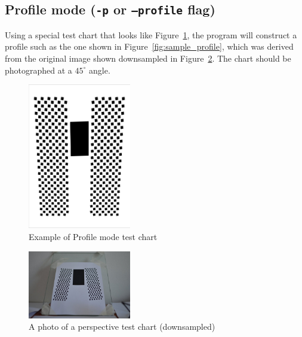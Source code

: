 \documentclass[a4paper]{article}
\begin{document}
\subsection{Profile mode (\texttt{-p} or \texttt{--profile} flag)}
\label{sec:profile_mode}
Using a special test chart that looks like
Figure~\ref{fig:profile_test_chart}, the program will construct a profile
such as the one shown in Figure~\ref{fig:sample_profile}, which was derived
from the original image shown downsampled in
Figure~\ref{fig:profile_test_chart_photo}. The chart should
be photographed at a $45^\circ$ angle.

\begin{figure}
\centering
\includegraphics[width=0.4\textwidth]{figures/mtf_profile_test_chart}
\caption{Example of Profile mode test chart}
\label{fig:profile_test_chart}
\end{figure}

\begin{figure}
\centering
\includegraphics[width=0.4\textwidth]{figures/perspective_sample_photo}
\caption{A photo of a perspective test chart (downsampled) }
\label{fig:profile_test_chart_photo}
\end{figure}
\end{document}
